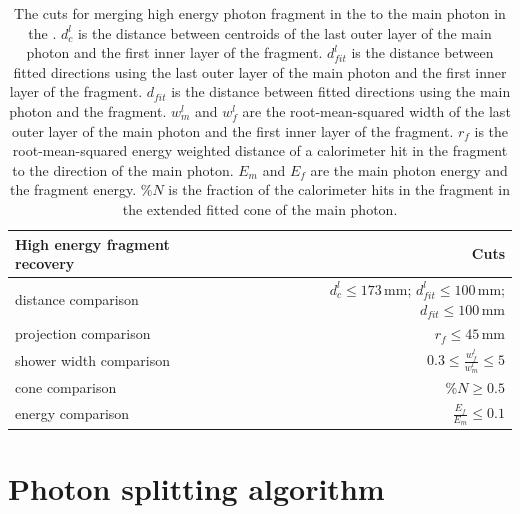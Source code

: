 \begin{table}[htbp]
\centering

\smallskip

\begin{tabular}{l r }
\hline
\hline
High energy fragment recovery&  Cuts\\
\hline
\multicolumn{1}{L{0.3\textwidth}}{distance comparison} & \multicolumn{1}{R{0.3\textwidth}}{$d^l_c \leqslant 173\,\text{mm}$; $d^l_{fit} \leqslant 100\,\text{mm}$; $d_{fit} \leqslant 100\,\text{mm}$} \\
\multicolumn{1}{L{0.3\textwidth}}{projection comparison} & \multicolumn{1}{R{0.3\textwidth}}{$ r_f \leqslant 45\,\text{mm}$} \\
\multicolumn{1}{L{0.3\textwidth}}{shower width comparison} & \multicolumn{1}{R{0.3\textwidth}}{$  0.3 \leqslant \frac{w^l_f}{w^l_m} \leqslant 5$} \\
\multicolumn{1}{L{0.3\textwidth}}{cone comparison} & \multicolumn{1}{R{0.3\textwidth}}{$ \%{N} \geqslant 0.5$} \\
\multicolumn{1}{L{0.3\textwidth}}{energy comparison} & \multicolumn{1}{R{0.3\textwidth}}{$ \frac{E_f}{E_m} \leqslant 0.1$} \\
\hline
\hline
\end{tabular}

\caption[Cuts for merging high energy photon fragment in the \HCAL.]%
{The cuts for merging high energy photon fragment in the \HCAL to the main photon in the \ECAL. $d^l_c$ is the distance between centroids of the last outer layer of the main photon and the first inner layer of the fragment. $d^l_{fit}$ is the distance between fitted directions using the last outer layer of the main photon and the first inner layer of the fragment. $d_{fit}$ is the distance between fitted directions using the main photon and the fragment. $w^l_m$ and $w^l_f$ are the  root-mean-squared width of the last outer layer of the main photon and the first inner layer of the fragment. $r_f$ is the root-mean-squared energy weighted distance of a calorimeter hit in the fragment to the direction of the main photon. $E_m$ and $E_f$ are the main photon energy and the fragment energy. $\%{N}$ is the fraction of the calorimeter hits in the fragment in the extended fitted cone of the main photon.}
\label{tab:photonHighEnergyFragCuts}
\end{table}

\section{Photon splitting algorithm}
\label{sec:photonSplitting}


